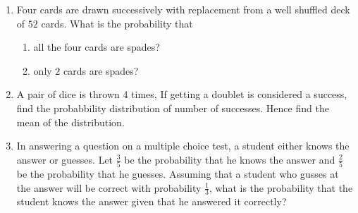 \begin{enumerate}
\item Four cards are drawn successively with replacement from a well shuffled deck of $52$ cards. What is the probability that
\begin{enumerate}
\item all the four cards are spades?
\item only $2$ cards are spades?
\end{enumerate}

\item A pair of dice is thrown $4$ times, If getting a doublet is considered a success, find the probabbility distribution of number of successes. Hence find the mean of the distribution. 

\item In answering a question on a multiple choice test, a student either knows the answer or guesses. Let $\frac{3}{5}$ be the probability that he knows the answer and $\frac{2}{5}$ be the probability that he guesses. Assuming that a student who gusses at the answer will be correct with probability $\frac{1}{3}$, what is the probability that the student knows the answer given that he answered it correctly?
\end{enumerate}
